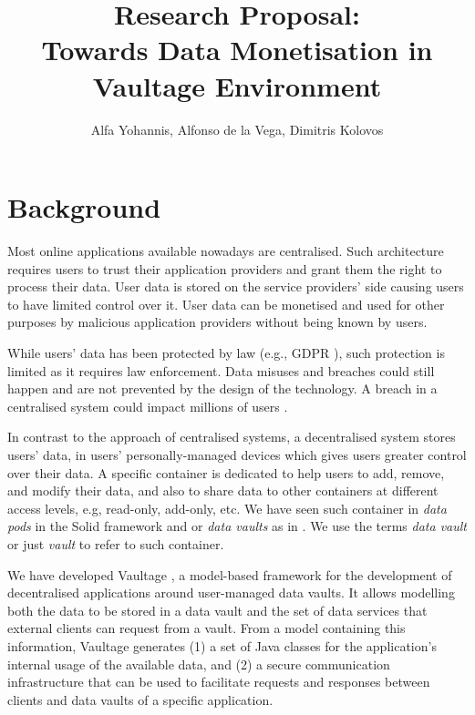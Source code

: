 \documentclass[]{article}
\title{Research Proposal:\\Towards Data Monetisation in Vaultage Environment}
\author{Alfa Yohannis, Alfonso de la Vega, Dimitris Kolovos}
\begin{document}
\maketitle

\begin{abstract}
  
\end{abstract}

\section{Background}
\label{sec:background}

Most online applications available nowadays are centralised. Such architecture requires users to trust their application providers and grant them the right to process their data. User data is stored on the service providers' side causing users to have limited control over it. User data can be monetised and used for other purposes by malicious application providers without being known by users.

While users' data has been protected by law (e.g., GDPR \cite{GDPR}), such protection is limited as it requires law enforcement. Data misuses and breaches could still happen and are not prevented by the design of the technology. A breach in a centralised system could impact millions of users 
\cite{cambridgeanalytica,adobebreach,linkedinbreach,yahoobreach}.

In contrast to the approach of centralised systems, a decentralised system stores users' data, in users' personally-managed devices which gives users greater control over their data. A specific container is dedicated to help users to add, remove, and modify their data, and also to share data to other containers at different access levels, e.g, read-only, add-only, etc. We have seen such container in \textit{data pods} in the Solid framework \cite{solid} and or \textit{data vaults} as in \cite{mun2010datavault}. We use the terms \textit{data vault} or just \textit{vault} to refer to such container.  

We have developed Vaultage \cite{yohannis2019towards,vaultage}, a model-based framework for the development of decentralised applications around user-managed data vaults.
It allows modelling both the data to be stored in a data vault and the set of data services that external clients can request from a vault.
From a model containing this information, Vaultage generates (1) a set of Java classes for the application's internal usage of the available data, and (2) a secure communication infrastructure that can be used to facilitate requests and responses between clients and data vaults of a specific application. 
\end{document}

